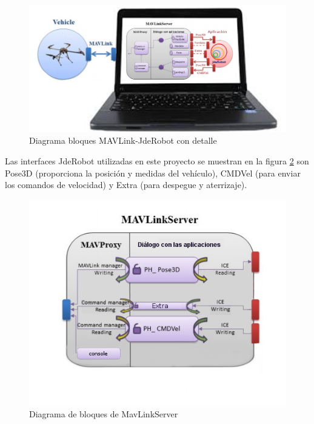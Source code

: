 \begin{figure}[H]
  \centering 
  \hspace*{-2.5cm}     
  \includegraphics[scale=0.55]{imagenes/cajaTransparente.png}
  \caption{Diagrama bloques MAVLink-JdeRobot con detalle}
  \label{fig:mavLinkJdeRobotTrasparente}
\end{figure}

Las interfaces JdeRobot utilizadas en este proyecto se muestran en la figura \ref{fig:MavProxyInside} son Pose3D (proporciona la posición y medidas del vehículo), CMDVel (para enviar los comandos de velocidad) y Extra (para despegue y aterrizaje).

\begin{figure}[H]
  \centering
  \includegraphics[scale=0.45]{imagenes/MavProxyPorDentro.png}
  \caption{Diagrama de bloques de MavLinkServer}
  \label{fig:MavProxyInside}
\end{figure}


